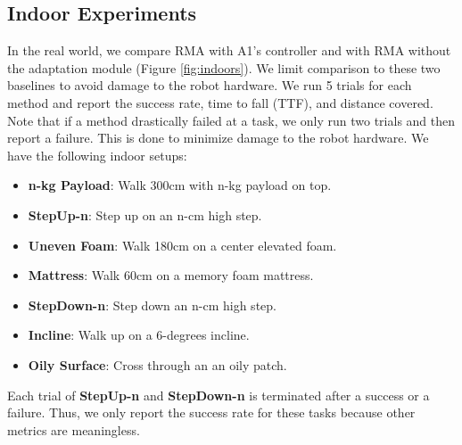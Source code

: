 \documentclass[conference]{IEEEtran}
\newcommand{\algo}{RMA}
\begin{document}
\subsection{Indoor Experiments}
In the real world, we compare \algo{} with A1's controller and with \algo{} without the adaptation module (Figure \ref{fig:indoors}). We limit comparison to these two baselines to avoid damage to the robot hardware. We run 5 trials for each method and report the success rate, time to fall (TTF), and distance covered. Note that if a method drastically failed at a task, we only run two trials and then report a failure. This is done to minimize damage to the robot hardware. We have the following indoor setups:
\begin{itemize}
    \item \textbf{n-kg Payload}: Walk 300cm with n-kg payload on top.
    \item \textbf{StepUp-n}: Step up on an n-cm high step.
    \item \textbf{Uneven Foam}: Walk 180cm on a center elevated foam.
    \item \textbf{Mattress}: Walk 60cm on a memory foam mattress.
    \item \textbf{StepDown-n}: Step down an n-cm high step.
    \item \textbf{Incline}: Walk up on a 6-degrees incline.
    \item \textbf{Oily Surface}: Cross through an an oily patch.
\end{itemize}

Each trial of \textbf{StepUp-n} and \textbf{StepDown-n} is terminated after a success or a failure. Thus, we only report the success rate for these tasks because other metrics are meaningless.   
\end{document}

